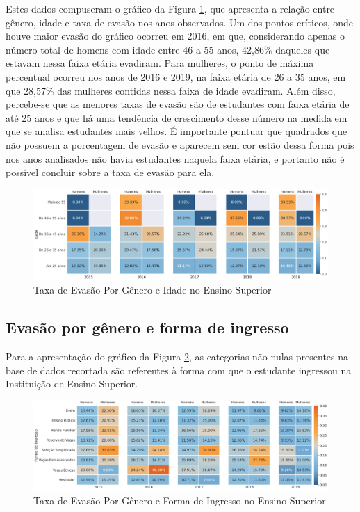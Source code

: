 \documentclass[a4paper]{article}
\begin{document}
Estes dados compuseram o gráfico da Figura \ref{fig:exampleFig4}, que apresenta a relação entre gênero, idade e taxa de evasão nos anos observados. Um dos pontos críticos, onde houve maior evasão do gráfico ocorreu em 2016, em que, considerando apenas o número total de homens com idade entre 46 a 55 anos, 42,86\% daqueles que estavam nessa faixa etária evadiram. Para mulheres, o ponto de máxima percentual ocorreu nos anos de 2016 e 2019, na faixa etária de 26 a 35 anos, em que 28,57\% das mulheres contidas nessa faixa de idade evadiram. Além disso, percebe-se que as menores taxas de evasão são de estudantes com faixa etária de até 25 anos e que há uma tendência de crescimento desse número na medida em que se analisa estudantes mais velhos. É importante pontuar que quadrados que não possuem a porcentagem de evasão e aparecem sem cor estão dessa forma pois nos anos analisados não havia estudantes naquela faixa etária, e portanto não é possível concluir sobre a taxa de evasão para ela.

\begin{figure}[ht]
\centering
\includegraphics[width=1\textwidth]{Evasão por gênero e idade.png}
\caption{Taxa de Evasão Por Gênero e Idade no Ensino Superior}
\label{fig:exampleFig4}
\end{figure}





\subsection{Evasão por gênero e forma de ingresso}\label{graf:generoeformadeingresso}
Para a apresentação do gráfico da Figura \ref{fig:exampleFig5}, as categorias não nulas presentes na base de dados recortada são referentes à forma com que o estudante ingressou na Instituição de Ensino Superior.


\begin{figure}[ht]
\centering
\includegraphics[width=1\textwidth]{Evasão por gênero e forma de ingresso.png}
\caption{Taxa de Evasão Por Gênero e Forma de Ingresso no Ensino Superior}
\label{fig:exampleFig5}
\end{figure}
\end{document}

